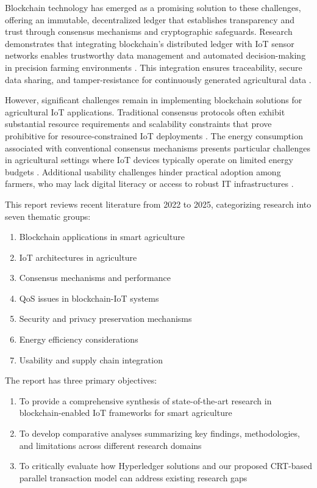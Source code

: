 \documentclass[12pt,onecolumn]{IEEEtran} %
\begin{document}
Blockchain technology has emerged as a promising solution to these challenges, offering an immutable, decentralized ledger that establishes transparency and trust through consensus mechanisms and cryptographic safeguards. Research demonstrates that integrating blockchain's distributed ledger with IoT sensor networks enables trustworthy data management and automated decision-making in precision farming environments \cite{aliyu2023blockchainbasedsmartfarm, ellahi2023blockchainbasedframeworksfor}. This integration ensures traceability, secure data sharing, and tamper-resistance for continuously generated agricultural data \cite{daund2025designofan}.

However, significant challenges remain in implementing blockchain solutions for agricultural IoT applications. Traditional consensus protocols often exhibit substantial resource requirements and scalability constraints that prove prohibitive for resource-constrained IoT deployments \cite{akella2023asystematicreview, mwewa2024blockchaintechnologya}. The energy consumption associated with conventional consensus mechanisms presents particular challenges in agricultural settings where IoT devices typically operate on limited energy budgets \cite{ninsiima2025determinantsofsmallholder}. Additional usability challenges hinder practical adoption among farmers, who may lack digital literacy or access to robust IT infrastructures \cite{mwewa2024blockchaintechnologya}.

This report reviews recent literature from 2022 to 2025, categorizing research into seven thematic groups:
\begin{enumerate}
    \item Blockchain applications in smart agriculture
    \item IoT architectures in agriculture
    \item Consensus mechanisms and performance
    \item QoS issues in blockchain-IoT systems
    \item Security and privacy preservation mechanisms
    \item Energy efficiency considerations
    \item Usability and supply chain integration
\end{enumerate}

The report has three primary objectives:
\begin{enumerate}
    \item To provide a comprehensive synthesis of state-of-the-art research in blockchain-enabled IoT frameworks for smart agriculture
    \item To develop comparative analyses summarizing key findings, methodologies, and limitations across different research domains
    \item To critically evaluate how Hyperledger solutions and our proposed CRT-based parallel transaction model can address existing research gaps
\end{enumerate}
\end{document}
